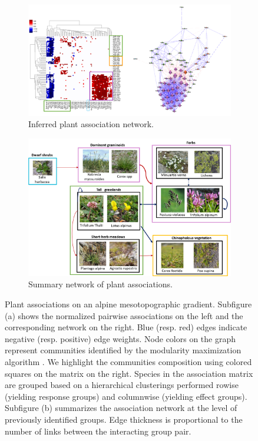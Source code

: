 \documentclass[10pt,a4paper]{article}
\begin{document}
\begin{figure}[bthp]
	\begin{subfigure}{\textwidth}
		\includegraphics[scale=0.4]{aravoassoc}
		\caption{Inferred plant association network. } \label{assocplant:a}
	\end{subfigure}
	\newline
	\begin{subfigure}{\textwidth}
		\includegraphics[scale=0.4]{groups}
		\caption{Summary network of plant associations.} \label{assocplant:b}
	\end{subfigure}
	\caption{Plant associations on an alpine mesotopographic gradient. Subfigure (a) shows the normalized pairwise associations on the left and the corresponding network on the right. Blue (resp. red) edges indicate negative (resp. positive) edge weights. Node colors on the graph represent communities identified by the modularity maximization algorithm \cite{newman2006modularity}. We highlight the communities composition using colored squares on the matrix on the right. Species in the association matrix are grouped based on a hierarchical clusterings performed rowise (yielding response groups) and columnwise (yielding effect groups). Subfigure (b) summarizes the association network at the level of previously identified groups. Edge thickness is proportional to the number of links between the interacting group pair.} \label{assocplant}
\end{figure}
\end{document}
